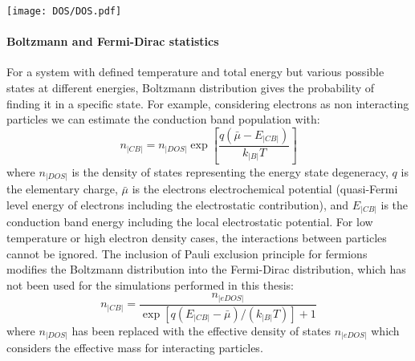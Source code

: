 		\begin{SCfigure}
			\centering
			\texttt{[image: DOS/DOS.pdf]}
			\label{fig:DOS}
		\end{SCfigure}
		

		\paragraph{Boltzmann and Fermi-Dirac statistics}
		For a system with defined temperature and total energy but various possible states at different energies, Boltzmann distribution gives the probability of finding it in a specific state.
		For example, considering electrons as non interacting particles we can estimate the conduction band population with:
		\begin{equation}\label{eq:boltzmann}
			n_|CB| = n_|DOS|\exp[\frac{q(\bar\mu-E_|CB|)}{k_|B|T}]
		\end{equation}
		where $n_|DOS|$ is the density of states representing the energy state degeneracy, $q$ is the elementary charge, $\bar\mu$ is the electrons electrochemical potential (quasi-Fermi level energy of electrons including the electrostatic contribution), and $E_|CB|$ is the conduction band energy including the local electrostatic potential.
		For low temperature or high electron density cases, the interactions between particles cannot be ignored.
		The inclusion of Pauli exclusion principle for fermions modifies the Boltzmann distribution into the Fermi\hyp{}Dirac distribution, which has not been used for the simulations performed in this thesis:
		\begin{equation}\label{eq:fermidirac}
		n_|CB| = \frac{n_|eDOS|}{\exp[q(E_|CB|-\bar\mu)/(k_|B|T)]+1}
		\end{equation}
		where $n_|DOS|$ has been replaced with the effective density of states $n_|eDOS|$ which considers the effective mass for interacting particles.

